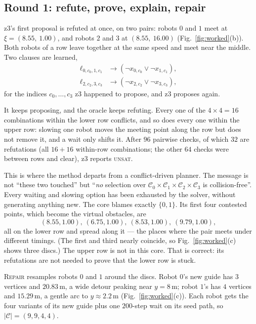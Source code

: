 \documentclass[conference]{IEEEtran}
\theoremstyle{plain}
\theoremstyle{definition}
\newcommand{\Cand}{\mathcal{C}}
\begin{document}
\subsection{Round 1: refute, prove, explain, repair}

z3's first proposal is refuted at once, on two pairs: robots $0$ and $1$ meet at
$\xi = (8.55,\ 1.00)$, and robots $2$ and $3$ at $(8.55,\ 16.00)$
(Fig.~\ref{fig:worked}(b)). Both robots of a row leave together at the same speed and meet near
the middle. Two clauses are learned,
\begin{align*}
  \ell_{0,c_0,1,c_1} &\rightarrow (\neg x_{0,c_0} \vee \neg x_{1,c_1}),\\
  \ell_{2,c_2,3,c_3} &\rightarrow (\neg x_{2,c_2} \vee \neg x_{3,c_3}),
\end{align*}
for the indices $c_0,\dots,c_3$ z3 happened to propose, and z3 proposes again.

It keeps proposing, and the oracle keeps refuting. Every one of the $4 \times 4 = 16$
combinations within the lower row conflicts, and so does every one within the upper row:
slowing one robot moves the meeting point along the row but does not remove it, and a wait only
shifts it. After $96$ pairwise checks, of which $32$ are refutations (all $16 + 16$ within-row
combinations; the other $64$ checks were between rows and clear), z3 reports \textsc{unsat}.

This is where the method departs from a conflict-driven planner. The message is not ``these two
touched'' but ``\emph{no} selection over $\Cand_0\times\Cand_1\times\Cand_2\times\Cand_3$ is
collision-free''. Every waiting and slowing option has been exhausted by the solver, without
generating anything new. The core blames exactly $\{0,1\}$. Its first four contested points,
which become the virtual obstacles, are
\[
  (8.55,1.00),\ (6.75,1.00),\ (8.53,1.00),\ (9.79,1.00),
\]
all on the lower row and spread along it --- the places where the pair meets under different
timings. (The first and third nearly coincide, so Fig.~\ref{fig:worked}(c) shows three discs.)
The upper row is not in this core. That is correct: its refutations are not needed to prove
that the lower row is stuck.

\textsc{Repair} resamples robots $0$ and $1$ around the discs. Robot $0$'s new guide has $3$
vertices and $20.83$\,m, a wide detour peaking near $y = 8$\,m; robot $1$'s has $4$ vertices and
$15.29$\,m, a gentle arc to $y \approx 2.2$\,m (Fig.~\ref{fig:worked}(c)). Each robot gets the four
variants of its new guide plus one $200$-step wait on its seed path, so $|\Cand| = (9,9,4,4)$.
\end{document}
